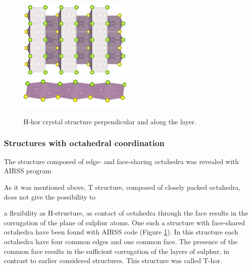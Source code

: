 \documentclass[a4paperm]{article}
\begin{document}
\begin{figure}[H]
	\includegraphics[width=0.5\textwidth]{H_hor_1.jpg} \\
	\includegraphics[width=0.5\textwidth]{H_hor_2.jpg}
	\caption{H-hor crystal structure perpendicular and along the layer.}
\label{H_hor}
\end{figure} 


\subsubsection{Structures with octahedral coordination}

The structure composed of edge- and face-sharing octahedra was revealed with AIRSS program

As it was mentioned above, T structure, composed of closely packed octahedra, does not give the possibility to 

 a flexibility as H-structure, as contact of octahedra through the face results in the corrugation of the plane of sulphur atoms. 
One such a structure with face-shared octahedra have been found with AIRSS code (Figure \ref{H_hor}).
In this structure each octahedra have four common edges and one common face.
The presence of the common face results in the sufficient corrugation of the layers of sulphur, in contrast to earlier considered structures.
This structure was called T-hor.

\end{document}

